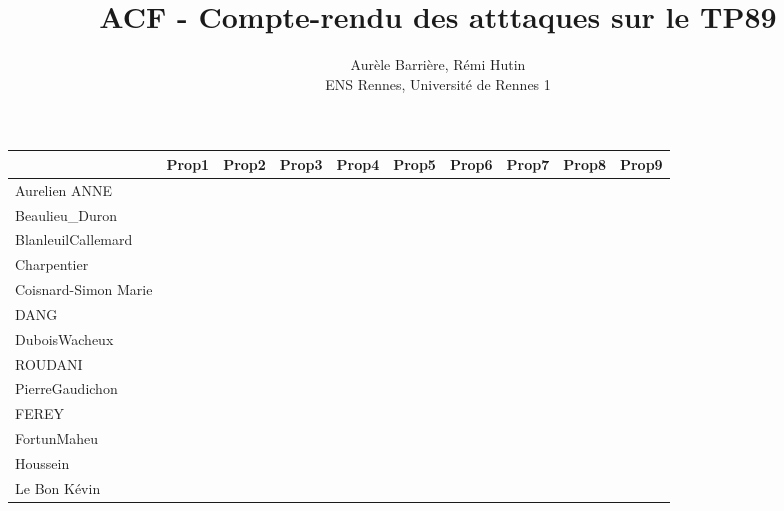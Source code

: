 \documentclass[a4paper]{article}
\begin{document}
\title{ACF - Compte-rendu des atttaques sur le TP89}
\author{Aurèle Barrière, Rémi Hutin \\ ENS Rennes, Université de Rennes 1}

\maketitle

\begin{table}[h!]
\small
\begin{tabular}{|l|c|c|c|c|c|c|c|c|c|} 
   \hline
                            & Prop1 & Prop2 & Prop3 & Prop4 & Prop5 & Prop6 & Prop7 & Prop8 & Prop9 \\ \hline \hline
    Aurelien ANNE           &       &       &       &       &       &       &       &       &       \\ \hline
    Beaulieu\_Duron         &       &       &       &       &       &       &       &       &       \\ \hline
    BlanleuilCallemard      &       &       &       &       &       &       &       &       &       \\ \hline
    Charpentier             &       &       &       &       &       &       &       &       &       \\ \hline
    Coisnard-Simon Marie    &       &       &       &       &       &       &       &       &       \\ \hline
    DANG                    &       &       &       &       &       &       &       &       &       \\ \hline
    DuboisWacheux           &       &       &       &       &       &       &       &       &       \\ \hline
    ROUDANI                 &       &       &       &       &       &       &       &       &       \\ \hline
    PierreGaudichon         &       &       &       &       &       &       &       &       &       \\ \hline
    FEREY                   &       &       &       &       &       &       &       &       &       \\ \hline
    FortunMaheu             &       &       &       &       &       &       &       &       &       \\ \hline
    Houssein                &       &       &       &       &       &       &       &       &       \\ \hline
    Le Bon Kévin            &       &       &       &       &       &       &       &       &       \\ \hline

\end{tabular}
\end{table}
\end{document}

